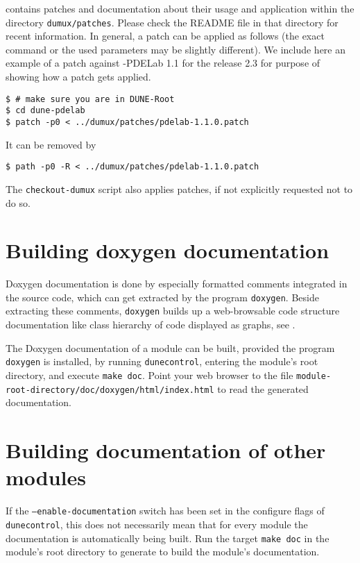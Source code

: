 \Dumux contains patches and documentation about their usage and application within the 
directory \texttt{dumux/patches}.
Please check the README file in that directory for recent information. 
In general, a patch can be applied as follows 
(the exact command or the used parameters may be slightly different).
We include here an example of a patch against \Dune-PDELab 1.1
for the \Dumux release 2.3 for purpose of showing how a patch gets applied. 

\begin{lstlisting}[style=Bash]
$ # make sure you are in DUNE-Root
$ cd dune-pdelab
$ patch -p0 < ../dumux/patches/pdelab-1.1.0.patch
\end{lstlisting}

It can be removed by 
\begin{lstlisting}[style=Bash]
$ path -p0 -R < ../dumux/patches/pdelab-1.1.0.patch
\end{lstlisting}

The \texttt{checkout-dumux} script also applies patches, if not explicitly requested not to do so.

\section{Building doxygen documentation} \label{sec:build-doxy-doc}
Doxygen documentation is done by especially formatted comments integrated in the source code, which can get extracted by the program 
\texttt{doxygen}. Beside extracting these comments, \texttt{doxygen} builds up a web-browsable code structure documentation
like class hierarchy of code displayed as graphs, see \cite{DOXYGEN-HP}.

The Doxygen documentation of a module can be built, provided the program \texttt{doxygen} is installed,
by running \texttt{dunecontrol}, entering the module's root directory, and execute \texttt{make doc}.
Point your web browser to the file 
\texttt{module-root-directory/doc/doxygen/html/index.html} to read the generated documentation.

\section{Building documentation of other \Dune modules}
If the \texttt{--enable-documentation} switch has been set in the configure flags of
\texttt{dunecontrol}, this does not necessarily mean that for every 
\Dune module the documentation is automatically being built. Run the target \texttt{make doc}
in the module's root directory to generate to build the module's documentation.

